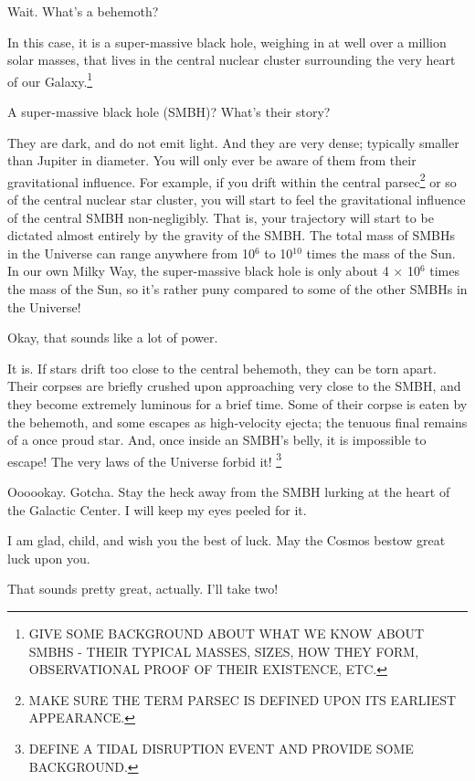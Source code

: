 \documentclass[main.tex]{subfiles}
\begin{document}
\newpara \Electra Wait.  What's a behemoth?

\newpara \Aethra In this case, it is a super-massive black hole, weighing in at well over a million solar masses, that lives in the central nuclear cluster surrounding the very heart of our Galaxy.\footnote{GIVE SOME BACKGROUND ABOUT WHAT WE KNOW ABOUT SMBHS - THEIR TYPICAL MASSES, SIZES, HOW THEY FORM, OBSERVATIONAL PROOF OF THEIR EXISTENCE, ETC.}  

\newpara \Electra A super-massive black hole (SMBH)?  What's their story?

\newpara \Aethra They are dark, and do not emit light.  And they are very dense; typically smaller than Jupiter in diameter.  You will only ever be aware of them from their gravitational influence.  For example, if you drift within the central parsec\footnote{MAKE SURE THE TERM PARSEC IS DEFINED UPON ITS EARLIEST APPEARANCE.} or so of the central nuclear star cluster, you will start to feel the gravitational influence of the central SMBH non-negligibly.  That is, your trajectory will start to be dictated almost entirely by the gravity of the SMBH.  The total mass of SMBHs in the Universe can range anywhere from 10$^6$ to 10$^{10}$ times the mass of the Sun.  In our own Milky Way, the super-massive black hole is only about 4 $\times$ 10$^6$ times the mass of the Sun, so it's rather puny compared to some of the other SMBHs in the Universe!

\newpara \Electra Okay, that sounds like a lot of power.

\newpara \Aethra It is.  If stars drift too close to the central behemoth, they can be torn apart.  Their corpses are briefly crushed upon approaching very close to the SMBH, and they become extremely luminous for a brief time.  Some of their corpse is eaten by the behemoth, and some escapes as high-velocity ejecta; the tenuous final remains of a once proud star.  And, once inside an SMBH's belly, it is impossible to escape!  The very laws of the Universe forbid it! \footnote{DEFINE A TIDAL DISRUPTION EVENT AND PROVIDE SOME BACKGROUND.}

\newpara \Electra Oooookay.  Gotcha.  Stay the heck away from the SMBH lurking at the heart of the Galactic Center.  I will keep my eyes peeled for it.

\newpara \Aethra I am glad, child, and wish you the best of luck.  May the Cosmos bestow great luck upon you.

\newpara \Electra That sounds pretty great, actually.  I'll take two!
\end{document}

